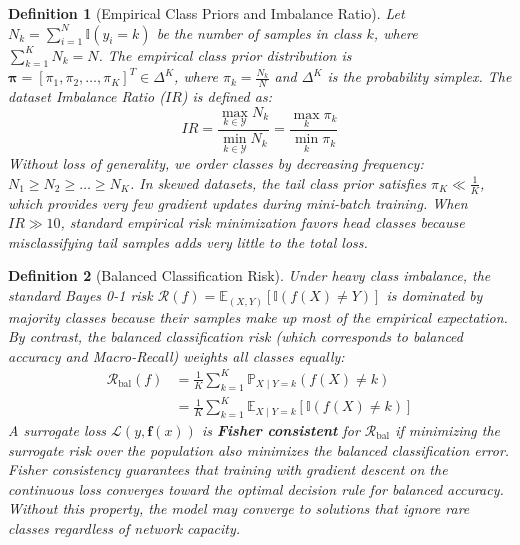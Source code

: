 \documentclass[10pt,journal,compsoc]{IEEEtran}
\newtheorem{definition}{Definition}
\begin{document}
\begin{definition}[Empirical Class Priors and Imbalance Ratio]
Let $N_k = \sum_{i=1}^N \mathbb{I}(y_i = k)$ be the number of samples in class $k$, where $\sum_{k=1}^K N_k = N$. The empirical class prior distribution is $\boldsymbol{\pi} = [\pi_1, \pi_2, \dots, \pi_K]^T \in \Delta^K$, where $\pi_k = \frac{N_k}{N}$ and $\Delta^K$ is the probability simplex. The dataset Imbalance Ratio ($IR$) is defined as:
\begin{equation}
    IR = \frac{\max_{k \in \mathcal{Y}} N_k}{\min_{k \in \mathcal{Y}} N_k} = \frac{\max_{k} \pi_k}{\min_{k} \pi_k}
\end{equation}
Without loss of generality, we order classes by decreasing frequency: $N_1 \ge N_2 \ge \dots \ge N_K$. In skewed datasets, the tail class prior satisfies $\pi_K \ll \frac{1}{K}$, which provides very few gradient updates during mini-batch training. When $IR \gg 10$, standard empirical risk minimization favors head classes because misclassifying tail samples adds very little to the total loss.
\end{definition}

\begin{definition}[Balanced Classification Risk]
Under heavy class imbalance, the standard Bayes 0-1 risk $\mathcal{R}(f) = \mathbb{E}_{(X, Y)}[\mathbb{I}(f(X) \neq Y)]$ is dominated by majority classes because their samples make up most of the empirical expectation. By contrast, the balanced classification risk (which corresponds to balanced accuracy and Macro-Recall) weights all classes equally:
\begin{align}
    \mathcal{R}_{\text{bal}}(f) &= \frac{1}{K} \sum_{k=1}^K \mathbb{P}_{X \mid Y=k}(f(X) \neq k) \nonumber \\
    &= \frac{1}{K} \sum_{k=1}^K \mathbb{E}_{X \mid Y=k} \left[ \mathbb{I}(f(X) \neq k) \right]
\end{align}
A surrogate loss $\mathcal{L}(y, \mathbf{f}(x))$ is \textbf{Fisher consistent} for $\mathcal{R}_{\text{bal}}$ if minimizing the surrogate risk over the population also minimizes the balanced classification error. Fisher consistency guarantees that training with gradient descent on the continuous loss converges toward the optimal decision rule for balanced accuracy. Without this property, the model may converge to solutions that ignore rare classes regardless of network capacity.
\end{definition}
\end{document}
